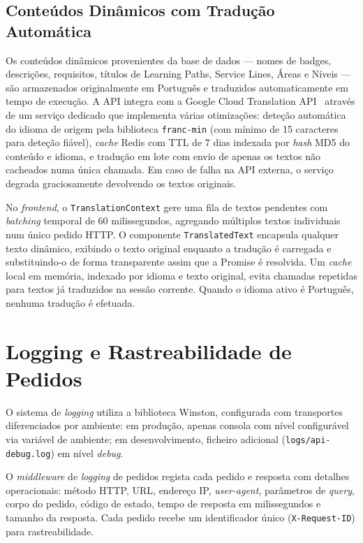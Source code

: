 \documentclass[12pt,a4paper]{report}
\begin{document}
\subsection{Conteúdos Dinâmicos com Tradução Automática}

Os conteúdos dinâmicos provenientes da base de dados --- nomes de badges, descrições, requisitos, títulos de Learning Paths, Service Lines, Áreas e Níveis --- são armazenados originalmente em Português e traduzidos automaticamente em tempo de execução. A API integra com a Google Cloud Translation API~\cite{googletranslate} através de um serviço dedicado que implementa várias otimizações: deteção automática do idioma de origem pela biblioteca \texttt{franc-min} (com mínimo de 15 caracteres para deteção fiável), \textit{cache} Redis com TTL de 7 dias indexada por \textit{hash} MD5 do conteúdo e idioma, e tradução em lote com envio de apenas os textos não cacheados numa única chamada. Em caso de falha na API externa, o serviço degrada graciosamente devolvendo os textos originais.

No \textit{frontend}, o \texttt{TranslationContext} gere uma fila de textos pendentes com \textit{batching} temporal de 60 milissegundos, agregando múltiplos textos individuais num único pedido HTTP. O componente \texttt{TranslatedText} encapsula qualquer texto dinâmico, exibindo o texto original enquanto a tradução é carregada e substituindo-o de forma transparente assim que a Promise é resolvida. Um \textit{cache} local em memória, indexado por idioma e texto original, evita chamadas repetidas para textos já traduzidos na sessão corrente. Quando o idioma ativo é Português, nenhuma tradução é efetuada.

\section{Logging e Rastreabilidade de Pedidos}

O sistema de \textit{logging} utiliza a biblioteca Winston, configurada com transportes diferenciados por ambiente: em produção, apenas consola com nível configurável via variável de ambiente; em desenvolvimento, ficheiro adicional (\texttt{logs/api-debug.log}) em nível \textit{debug}.

O \textit{middleware} de \textit{logging} de pedidos regista cada pedido e resposta com detalhes operacionais: método HTTP, URL, endereço IP, \textit{user-agent}, parâmetros de \textit{query}, corpo do pedido, código de estado, tempo de resposta em milissegundos e tamanho da resposta. Cada pedido recebe um identificador único (\texttt{X-Request-ID}) para rastreabilidade.
\end{document}
